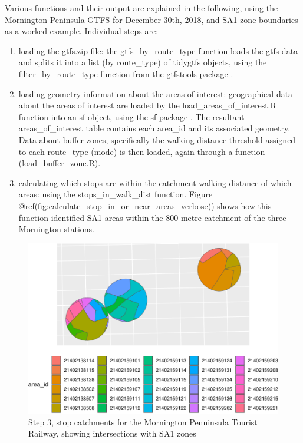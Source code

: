 \documentclass[preprint, 3p,
authoryear]{elsarticle} %
\begin{document}
Various functions and their output are explained in the following, using
the Mornington Peninsula GTFS for December 30th, 2018, and SA1 zone
boundaries as a worked example. Individual steps are:

\begin{enumerate}
\def\labelenumi{(\arabic{enumi})}
\item
  loading the gtfs.zip file: the gtfs\_by\_route\_type function loads
  the gtfs data and splits it into a list (by route\_type) of tidygtfs
  objects, using the filter\_by\_route\_type function from the gtfstools
  package \citep{filter_GTFS_by_mode}.
\item
  loading geometry information about the areas of interest: geographical
  data about the areas of interest are loaded by the
  load\_areas\_of\_interest.R function into an sf object, using the sf
  package \citep{R-sf}. The resultant areas\_of\_interest table contains
  each area\_id and its associated geometry. Data about buffer zones,
  specifically the walking distance threshold assigned to each
  route\_type (mode) is then loaded, again through a function
  (load\_buffer\_zone.R).
\item
  calculating which stops are within the catchment walking distance of
  which areas: using the stops\_in\_walk\_dist function. Figure
  @ref(fig:calculate\_stop\_in\_or\_near\_areas\_verbose)) shows how
  this function identified SA1 areas within the 800 metre catchment of
  the three Mornington stations.
\end{enumerate}

\begin{figure}
\includegraphics[width=1\linewidth]{Leveraging_GTFS_to_assess_transit_supply_Transport_Geography_files/figure-latex/calculate_stop_in_or_near_areas_verbose-1} \caption{Step 3, stop catchments for the Mornington Penninsula Tourist Railway, showing intersections with SA1 zones}\label{fig:calculate_stop_in_or_near_areas_verbose}
\end{figure}
\end{document}
